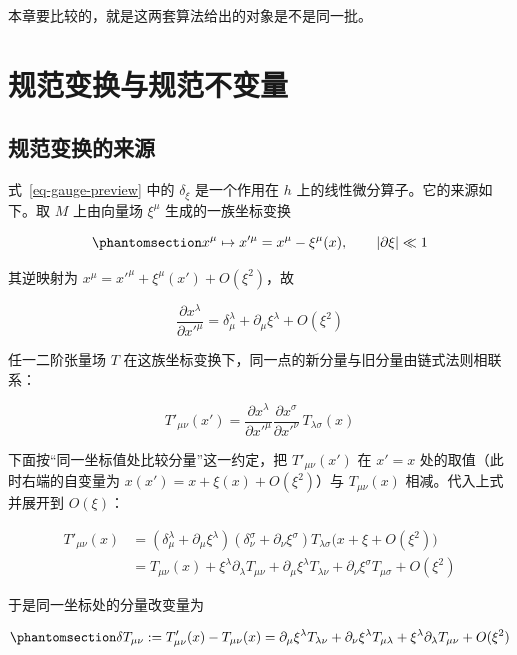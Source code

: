 \documentclass[
  chinese,
  a4paper,
  UTF8,
  12pt,
  oneside,
  openany]{ctexbook}
\theoremstyle{plain}
\theoremstyle{plain}
\theoremstyle{plain}
\theoremstyle{definition}
\theoremstyle{plain}
\theoremstyle{plain}
\theoremstyle{remark}
\begin{document}
本章要比较的，就是这两套算法给出的对象是不是同一批。

\section{规范变换与规范不变量}\label{sec-fsg-gauge}

\subsection{规范变换的来源}\label{ux89c4ux8303ux53d8ux6362ux7684ux6765ux6e90}

式~\ref{eq-gauge-preview} 中的 \(\delta_{\xi}\) 是一个作用在 \(h\)
上的线性微分算子。它的来源如下。取 \(M\) 上由向量场 \(\xi^{\mu}\)
生成的一族坐标变换

\begin{equation}\protect\phantomsection\label{eq-coord-change}{
x^{\mu}\mapsto x'^{\mu}=x^{\mu}-\xi^{\mu}(x),
\qquad
|\partial\xi|\ll1
}\end{equation}

其逆映射为 \(x^{\mu}=x'^{\mu}+\xi^{\mu}(x')+O(\xi^{2})\)，故

\[
\frac{\partial x^{\lambda}}{\partial x'^{\mu}}
=\delta^{\lambda}_{\mu}+\partial_{\mu}\xi^{\lambda}+O(\xi^{2})
\]

任一二阶张量场 \(T\)
在这族坐标变换下，同一点的新分量与旧分量由链式法则相联系：

\[
T'_{\mu\nu}(x')
=\frac{\partial x^{\lambda}}{\partial x'^{\mu}}
\frac{\partial x^{\sigma}}{\partial x'^{\nu}}\,T_{\lambda\sigma}(x)
\]

下面按``同一坐标值处比较分量''这一约定，把 \(T'_{\mu\nu}(x')\) 在
\(x'=x\) 处的取值（此时右端的自变量为 \(x(x')=x+\xi(x)+O(\xi^{2})\)）与
\(T_{\mu\nu}(x)\) 相减。代入上式并展开到 \(O(\xi)\)：

\[
\begin{aligned}
T'_{\mu\nu}(x)
&=\left(\delta^{\lambda}_{\mu}+\partial_{\mu}\xi^{\lambda}\right)
\left(\delta^{\sigma}_{\nu}+\partial_{\nu}\xi^{\sigma}\right)
T_{\lambda\sigma}\bigl(x+\xi+O(\xi^{2})\bigr)\\
&=T_{\mu\nu}(x)+\xi^{\lambda}\partial_{\lambda}T_{\mu\nu}
+\partial_{\mu}\xi^{\lambda}T_{\lambda\nu}
+\partial_{\nu}\xi^{\sigma}T_{\mu\sigma}+O(\xi^{2})
\end{aligned}
\]

于是同一坐标处的分量改变量为

\begin{equation}\protect\phantomsection\label{eq-tensor-change}{
\delta T_{\mu\nu}:=T'_{\mu\nu}(x)-T_{\mu\nu}(x)
=\partial_{\mu}\xi^{\lambda}T_{\lambda\nu}
+\partial_{\nu}\xi^{\lambda}T_{\mu\lambda}
+\xi^{\lambda}\partial_{\lambda}T_{\mu\nu}
+O(\xi^{2})
}\end{equation}
\end{document}
